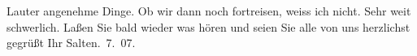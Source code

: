 \begin{ledgroupsized}[t]{13cm}
               Lauter angenehme Dinge. Ob wir dann noch fortreisen, weiss ich nicht. Sehr weit
               schwerlich. Laßen Sie bald wieder was hören und seien Sie alle von uns herzlichst
               gegrüßt\pend
           \pstart Ihr \spacefill\mbox{Salten}\pend{}. 7. 07.\pend
           
         
         \endnumbering{}\end{ledgroupsized}  \newcommand{\dateiname}{L03488}\newcommand{\titel}{Felix Salten an Arthur Schnitzler, 15. 7. 1907}\newcommand{\editorInnen}{Martin Anton Müller und Laura Untner}
      